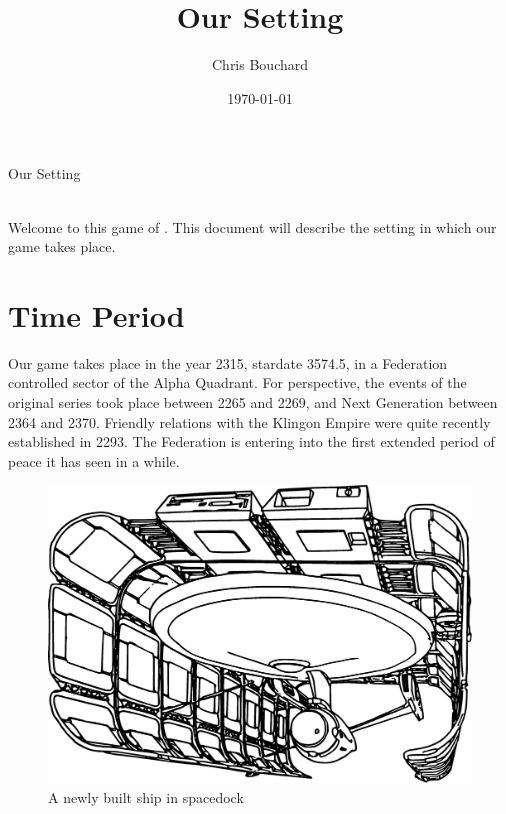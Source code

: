 \documentclass[12pt]{article}
\title{Our \StarTrekFate{} Setting}
\author{Chris Bouchard}
\date{\mydate\today}
\begin{document}
\begin{center}
    \vspace*{0.5in}
    {\startrek\fontsize{0.45in}{0.3in}\selectfont%
        Our {\fontsize{0.55in}{0.3in}\selectfont\StarTrekFate{}} Setting%
    }\\
    \vspace*{0.5in}
    {\Large\theauthor}\\
    \vspace*{0.2in}
    \thedate
    \vspace{0.5in}
\end{center}

\noindent
Welcome to this game of \StarTrekFate{}. This document will describe the
setting in which our game takes place.

\section{Time Period}
Our game takes place in the year 2315, stardate 3574.5, in a Federation
controlled sector of the Alpha Quadrant. For perspective, the events of the
original series took place between 2265 and 2269, and Next Generation between
2364 and 2370. Friendly relations with the Klingon Empire were quite recently
established in 2293. The Federation is entering into the first extended period
of peace it has seen in a while.

\begin{figure}
    \centering
    \includegraphics[width=0.8\linewidth]{img/SpaceDock.eps}\\
    \vspace{2ex}
    \footnotesize A newly built ship in spacedock
    \vspace{-2em}
\end{figure}
\end{document}
